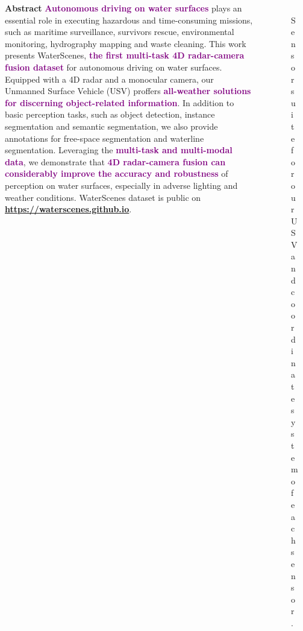 \documentclass[final]{beamer}
\begin{document}
\begin{frame}[t]
\begin{columns}[t]
\begin{column}{0.53\paperwidth}
\begin{block}{\Large{\textbf{Abstract}}}
\large
\textcolor{purple}{\textbf{Autonomous driving on water surfaces}} plays an essential role in executing hazardous and time-consuming missions, such as maritime surveillance, survivors rescue, environmental monitoring, hydrography mapping and waste cleaning. 
This work presents WaterScenes, \textcolor{purple}{\textbf{the first multi-task 4D radar-camera fusion dataset}} for autonomous driving on water surfaces. Equipped with a 4D radar and a monocular camera, our Unmanned Surface Vehicle (USV) proffers \textcolor{purple}{\textbf{all-weather solutions for discerning object-related information}}. In addition to basic perception tasks, such as object detection, instance segmentation and semantic segmentation, we also provide annotations for free-space segmentation and waterline segmentation.
Leveraging the \textcolor{purple}{\textbf{multi-task and multi-modal data}}, we demonstrate that \textcolor{purple}{\textbf{4D radar-camera fusion can considerably improve the accuracy and robustness}} of perception on water surfaces, especially in adverse lighting and weather conditions.
WaterScenes dataset is public on \textcolor{purple}{\textbf{\url{https://waterscenes.github.io}}}.
\end{block}
\end{column}
\begin{column}{0.39\paperwidth}
\vspace{2cm}
\begin{figure}
\centering
\includegraphics[width=1\textwidth]{images/usv.png}
\caption{Sensor suite for our USV and coordinate system of each sensor.}
\end{figure}
\end{column}
\end{columns}


\end{frame}
\end{document}
